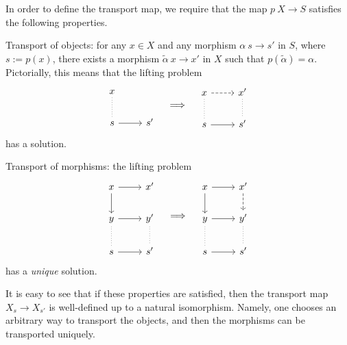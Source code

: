 In order to define the transport map, 
we require that the map $p\:X\to S$ satisfies the following properties.
\begin{itms}
    \item Transport of objects: for any $x\in X$ and any morphism $\alpha\:s\to s'$ in $S$,
    where $s:=p(x)$,
    there exists a morphism $\tilde\alpha\:x\to x'$ in $X$ such that $p(\tilde\alpha)=\alpha$.
    Pictorially, this means that the lifting problem
    \[\begin{tikzcd}
        x\ar[d,dotted,dash] \\
        s \ar[r] & s'
    \end{tikzcd}\quad\Longrightarrow\quad\begin{tikzcd}
        x\ar[r,dashed]\ar[d,dotted,dash] & x'\ar[d,dotted,dash] \\
        s \ar[r] & s'
    \end{tikzcd}\]
    has a solution.
    \item Transport of morphisms: the lifting problem 
    \[\begin{tikzcd}
        x\ar[d]\ar[r] & x' \\
        y\ar[d,dotted,dash]\ar[r] & y'\ar[d,dotted,dash] \\
        s \ar[r] & s'
    \end{tikzcd}\quad\Longrightarrow\quad\begin{tikzcd}
        x\ar[d]\ar[r] & x'\ar[d,dashed] \\
        y\ar[d,dotted,dash]\ar[r] & y'\ar[d,dotted,dash] \\
        s \ar[r] & s'
    \end{tikzcd}\]
    has a \emph{unique} solution.
\end{itms}

It is easy to see that if these properties are satisfied,
then the transport map $X_s\to X_{s'}$ is well-defined up to a natural isomorphism.
Namely, one chooses an arbitrary way to transport the objects,
and then the morphisms can be transported uniquely.

